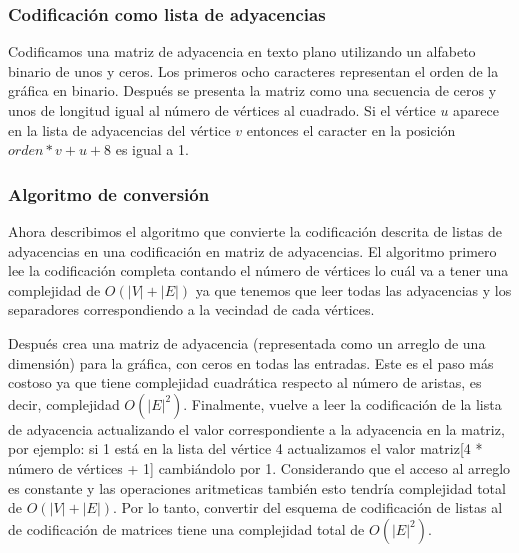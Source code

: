 \documentclass[11pt]{article}
\begin{document}
\subsubsection*{Codificación como lista de adyacencias}
Codificamos una matriz de adyacencia en texto plano utilizando un alfabeto
binario de unos y ceros. Los primeros ocho caracteres representan el orden de la
gráfica en binario. Después se presenta la matriz como una secuencia de ceros y
unos de longitud igual al número de vértices al cuadrado. Si el vértice $u$
aparece en la lista de adyacencias del vértice $v$ entonces el caracter en la
posición $orden * v + u + 8$ es igual a 1.

\subsubsection*{Algoritmo de conversión}
Ahora describimos el algoritmo que convierte la codificación descrita de listas
de adyacencias en una codificación en matriz de adyacencias. El algoritmo
primero lee la codificación completa contando el número de vértices lo cuál va a
tener una complejidad de $O(|V| + |E|)$ ya que tenemos que leer todas las
adyacencias y los separadores correspondiendo a la vecindad de cada vértices.

Después crea una matriz de adyacencia (representada como un arreglo de una
dimensión) para la gráfica, con ceros en todas las entradas. Este es el paso más
costoso ya que tiene complejidad cuadrática respecto al número de aristas, es
decir, complejidad $O(|E|^2)$. Finalmente, vuelve a leer la codificación de la
lista de adyacencia actualizando el valor correspondiente a la adyacencia en la
matriz, por ejemplo: si 1 está en la lista del vértice 4 actualizamos el valor
matriz[4 * número de vértices + 1] cambiándolo por 1. Considerando que el acceso
al arreglo es constante y las operaciones aritmeticas también esto tendría complejidad
total de $O(|V| + |E|)$. Por lo tanto, convertir del esquema de codificación de
listas al de codificación de matrices tiene una complejidad total de $O(|E|^2)$.
\end{document}
